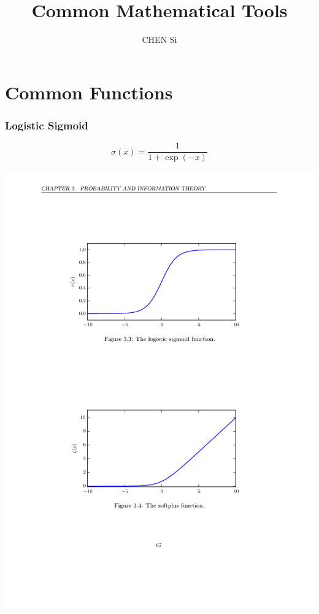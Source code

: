 \documentclass[12pt, a4paper]{article}
\title{Common Mathematical Tools}
\author{CHEN Si}
\date{}
\begin{document}
 


\maketitle
\tableofcontents


\newpage
\part{Common Functions}


\section{Logistic Sigmoid}
\begin{minipage}[c]{0.4\linewidth}
    \[
        \sigma(x) = \frac{1}{1 + \exp(-x)}
    \]
\end{minipage}
\hfill
\begin{minipage}[c]{0.6\linewidth}
    \includegraphics[width=\textwidth]{../imgs/Logistic_Sigmoid.pdf}
\end{minipage}
\end{document}
